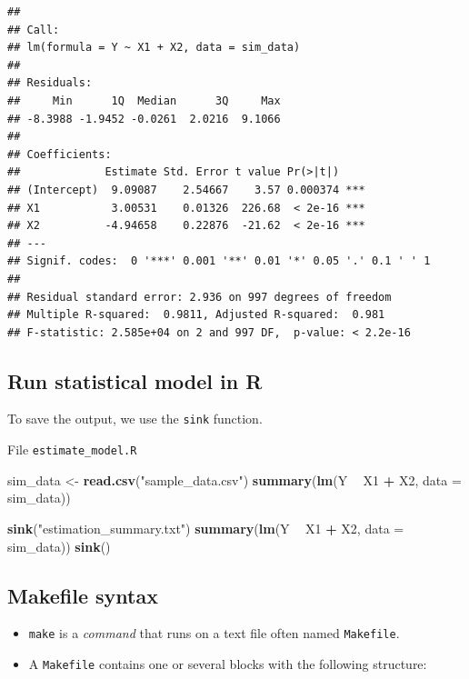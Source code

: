\documentclass[]{book}
\newenvironment{Shaded}{\begin{snugshade}}{\end{snugshade}}
\newcommand{\KeywordTok}[1]{\textcolor[rgb]{0.13,0.29,0.53}{\textbf{#1}}}
\newcommand{\DataTypeTok}[1]{\textcolor[rgb]{0.13,0.29,0.53}{#1}}
\newcommand{\StringTok}[1]{\textcolor[rgb]{0.31,0.60,0.02}{#1}}
\newcommand{\OperatorTok}[1]{\textcolor[rgb]{0.81,0.36,0.00}{\textbf{#1}}}
\newcommand{\NormalTok}[1]{#1}
\theoremstyle{definition}
\theoremstyle{definition}
\theoremstyle{definition}
\theoremstyle{remark}
\begin{document}
\begin{verbatim}
## 
## Call:
## lm(formula = Y ~ X1 + X2, data = sim_data)
## 
## Residuals:
##     Min      1Q  Median      3Q     Max 
## -8.3988 -1.9452 -0.0261  2.0216  9.1066 
## 
## Coefficients:
##             Estimate Std. Error t value Pr(>|t|)    
## (Intercept)  9.09087    2.54667    3.57 0.000374 ***
## X1           3.00531    0.01326  226.68  < 2e-16 ***
## X2          -4.94658    0.22876  -21.62  < 2e-16 ***
## ---
## Signif. codes:  0 '***' 0.001 '**' 0.01 '*' 0.05 '.' 0.1 ' ' 1
## 
## Residual standard error: 2.936 on 997 degrees of freedom
## Multiple R-squared:  0.9811, Adjusted R-squared:  0.981 
## F-statistic: 2.585e+04 on 2 and 997 DF,  p-value: < 2.2e-16
\end{verbatim}

\subsection{Run statistical model in
R}\label{run-statistical-model-in-r-1}

To save the output, we use the \texttt{sink} function.

File \texttt{estimate\_model.R}

\begin{Shaded}
\begin{Highlighting}[]
\NormalTok{sim_data <-}\StringTok{ }\KeywordTok{read.csv}\NormalTok{(}\StringTok{"sample_data.csv"}\NormalTok{)}
\KeywordTok{summary}\NormalTok{(}\KeywordTok{lm}\NormalTok{(Y }\OperatorTok{~}\StringTok{ }\NormalTok{X1 }\OperatorTok{+}\StringTok{ }\NormalTok{X2, }\DataTypeTok{data =}\NormalTok{ sim_data))}

\KeywordTok{sink}\NormalTok{(}\StringTok{"estimation_summary.txt"}\NormalTok{)}
\KeywordTok{summary}\NormalTok{(}\KeywordTok{lm}\NormalTok{(Y }\OperatorTok{~}\StringTok{ }\NormalTok{X1 }\OperatorTok{+}\StringTok{ }\NormalTok{X2, }\DataTypeTok{data =}\NormalTok{ sim_data))}
\KeywordTok{sink}\NormalTok{()}
\end{Highlighting}
\end{Shaded}

\subsection{Makefile syntax}\label{makefile-syntax}

\begin{itemize}
\item
  \texttt{make} is a \emph{command} that runs on a text file often named
  \texttt{Makefile}.
\item
  A \texttt{Makefile} contains one or several blocks with the following
  structure:
\end{itemize}
\end{document}
